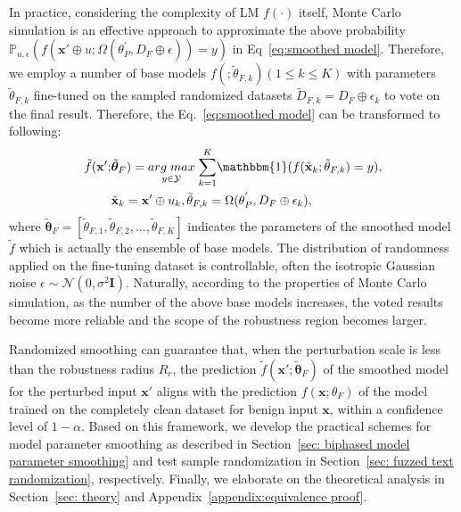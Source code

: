 In practice, considering the complexity of LM $f(\cdot)$ itself, Monte Carlo simulation is an effective approach to approximate the above probability $\mathbb{P}_{u, \epsilon}(f(\mathbf{x}'\oplus u;\Omega(\theta^{'}_P, D_F \oplus \epsilon))=y)$ in Eq~\ref{eq:smoothed model}. Therefore, we employ a number of base models $f(;\tilde{\theta}_{F,k}) (1\leq k \leq K)$ with parameters $\tilde{\theta}_{F,k}$ fine-tuned on the sampled randomized datasets $\tilde{D}_{F,k} = D_F \oplus \epsilon_k$ to vote on the final result. Therefore, the Eq.~\ref{eq:smoothed model} can be transformed to following:
\begin{equation}
\begin{aligned}
\tilde{f}(\mathbf{x}';&\tilde{\bm{\theta}}_F) = \underset{y \in \mathcal{Y}}{arg \; max} \; \underset{k=1}{\sum^K} \mathbbm{1}(f(\tilde{\mathbf{x}}_k;\tilde{\theta}_{F,k})=y), \\
&\tilde{\mathbf{x}}_k = \mathbf{x}'\oplus u_k, \tilde{\theta}_{F,k} = \Omega(\theta^{'}_P, D_F \oplus \epsilon_k),
\end{aligned}
\label{eq: MCS}
\end{equation}
where $\tilde{\bm{\theta}}_F=[\tilde{\theta}_{F,1}, \tilde{\theta}_{F,2},..., \tilde{\theta}_{F,K}]$ indicates the parameters of the smoothed model $\tilde{f}$ which is actually the ensemble of base models. The distribution of randomness applied on the fine-tuning dataset is controllable, often the isotropic Gaussian noise $\epsilon \sim \mathcal{N}(0, \sigma^2\mathbf{I})$. Naturally, according to the properties of Monte Carlo simulation, as the number of the above base models increases, the voted results become more reliable and the scope of the robustness region becomes larger.

Randomized smoothing can guarantee that, when the perturbation scale is less than the robustness radius $R_r$, the prediction $\tilde{f}(\mathbf{x}';\tilde{\bm{\theta}}_F)$ of the smoothed model for the perturbed input $\mathbf{x}'$ aligns with the prediction $f(\mathbf{x};\theta_F)$ of the model trained on the completely clean dataset for benign input $\mathbf{x}$, within a confidence level of $1-\alpha$.
Based on this framework, we develop the practical schemes for model parameter smoothing as described in Section~\ref{sec: biphased model parameter smoothing} and test sample randomization in Section~\ref{sec: fuzzed text randomization}, respectively. Finally, we elaborate on the theoretical analysis in Section~\ref{sec: theory} and Appendix~\ref{appendix:equivalence proof}.

